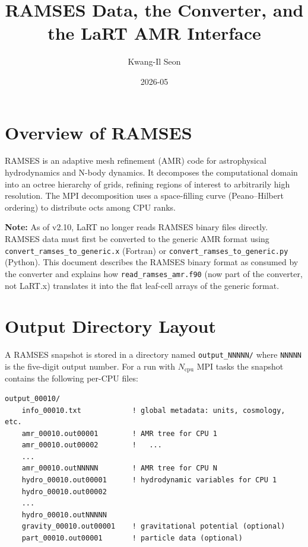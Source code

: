 \documentclass[english,a4paper]{my_memo}
\begin{document}
\title{RAMSES Data, the Converter, and the LaRT AMR Interface}
\author{Kwang-Il Seon}
\date{2026-05}
\maketitle

\tableofcontents
\bigskip

\section{Overview of RAMSES}

RAMSES \cite{teyssier2002} is an adaptive mesh refinement (AMR) code for
astrophysical hydrodynamics and N-body dynamics.  It decomposes the
computational domain into an octree hierarchy of grids, refining regions of
interest to arbitrarily high resolution.  The MPI decomposition uses a
space-filling curve (Peano--Hilbert ordering) to distribute octs among CPU
ranks.

\textbf{Note:} As of v2.10, LaRT no longer reads RAMSES binary files
directly.  RAMSES data must first be converted to the generic AMR format
using \texttt{convert\_ramses\_to\_generic.x} (Fortran) or
\texttt{convert\_ramses\_to\_generic.py} (Python).  This document describes
the RAMSES binary format as consumed by the converter and explains how
\texttt{read\_ramses\_amr.f90} (now part of the converter, not LaRT.x)
translates it into the flat leaf-cell arrays of the generic format.

\section{Output Directory Layout}

A RAMSES snapshot is stored in a directory named
\texttt{output\_NNNNN/} where \texttt{NNNNN} is the five-digit output number.
For a run with $N_\mathrm{cpu}$ MPI tasks the snapshot contains the following
per-CPU files:

\begin{lstlisting}[style=shellstyle]
output_00010/
    info_00010.txt            ! global metadata: units, cosmology, etc.
    amr_00010.out00001        ! AMR tree for CPU 1
    amr_00010.out00002        !   ...
    ...
    amr_00010.outNNNNN        ! AMR tree for CPU N
    hydro_00010.out00001      ! hydrodynamic variables for CPU 1
    hydro_00010.out00002
    ...
    hydro_00010.outNNNNN
    gravity_00010.out00001    ! gravitational potential (optional)
    part_00010.out00001       ! particle data (optional)
\end{lstlisting}
\end{document}
